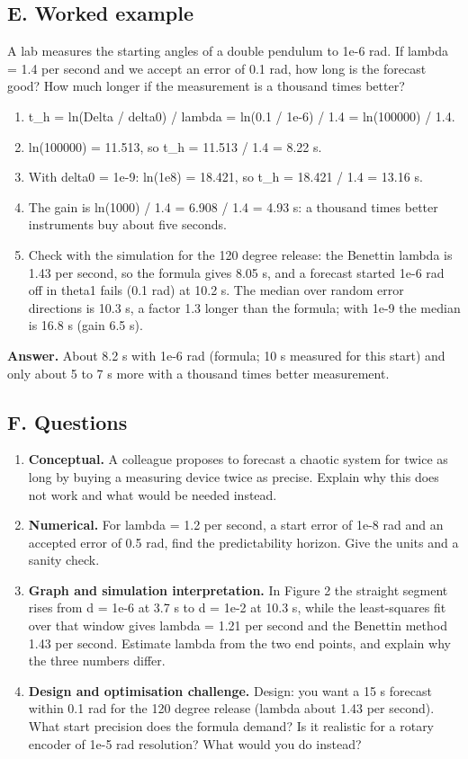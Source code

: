 \documentclass[11pt,a4paper]{article}
\begin{document}
\subsection*{E. Worked example}
A lab measures the starting angles of a double pendulum to 1e-6 rad. If lambda = 1.4 per second and we accept an error of 0.1 rad, how long is the forecast good? How much longer if the measurement is a thousand times better?
\begin{enumerate}[nosep]
\item t\_h = ln(Delta / delta0) / lambda = ln(0.1 / 1e-6) / 1.4 = ln(100000) / 1.4.
\item ln(100000) = 11.513, so t\_h = 11.513 / 1.4 = 8.22 s.
\item With delta0 = 1e-9: ln(1e8) = 18.421, so t\_h = 18.421 / 1.4 = 13.16 s.
\item The gain is ln(1000) / 1.4 = 6.908 / 1.4 = 4.93 s: a thousand times better instruments buy about five seconds.
\item Check with the simulation for the 120 degree release: the Benettin lambda is 1.43 per second, so the formula gives 8.05 s, and a forecast started 1e-6 rad off in theta1 fails (0.1 rad) at 10.2 s. The median over random error directions is 10.3 s, a factor 1.3 longer than the formula; with 1e-9 the median is 16.8 s (gain 6.5 s).
\end{enumerate}
\textbf{Answer.} About 8.2 s with 1e-6 rad (formula; 10 s measured for this start) and only about 5 to 7 s more with a thousand times better measurement.

\subsection*{F. Questions}
\begin{enumerate}[nosep]
\item \textbf{Conceptual.} A colleague proposes to forecast a chaotic system for twice as long by buying a measuring device twice as precise. Explain why this does not work and what would be needed instead.
\item \textbf{Numerical.} For lambda = 1.2 per second, a start error of 1e-8 rad and an accepted error of 0.5 rad, find the predictability horizon. Give the units and a sanity check.
\item \textbf{Graph and simulation interpretation.} In Figure 2 the straight segment rises from d = 1e-6 at 3.7 s to d = 1e-2 at 10.3 s, while the least-squares fit over that window gives lambda = 1.21 per second and the Benettin method 1.43 per second. Estimate lambda from the two end points, and explain why the three numbers differ.
\item \textbf{Design and optimisation challenge.} Design: you want a 15 s forecast within 0.1 rad for the 120 degree release (lambda about 1.43 per second). What start precision does the formula demand? Is it realistic for a rotary encoder of 1e-5 rad resolution? What would you do instead?
\end{enumerate}
\end{document}
